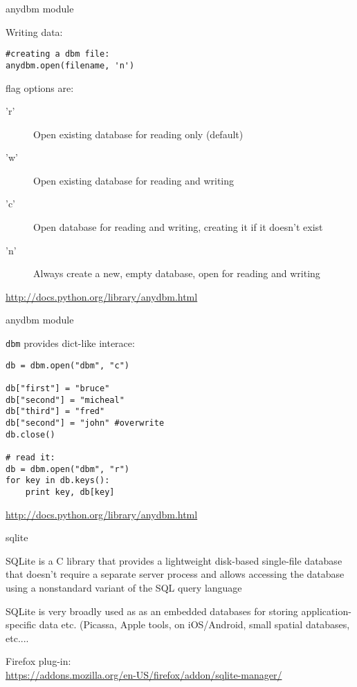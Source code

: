 \documentclass{beamer}
\begin{document}
\begin{frame}[fragile]{anydbm module}

{\Large Writing data:}

\begin{verbatim}
#creating a dbm file:
anydbm.open(filename, 'n') 
\end{verbatim}

{\large flag options are: }
\begin{description}
  \item['r'] 	Open existing database for reading only (default)
  \item['w'] 	Open existing database for reading and writing
  \item['c'] 	Open database for reading and writing, creating it if it doesn’t exist
  \item['n'] 	Always create a new, empty database, open for reading and writing
\end{description}
\vfill
\url{http://docs.python.org/library/anydbm.html}
\end{frame}

\begin{frame}[fragile]{anydbm module}

{\Large \verb|dbm| provides dict-like interace:}

\begin{verbatim}
db = dbm.open("dbm", "c")

db["first"] = "bruce"
db["second"] = "micheal"
db["third"] = "fred"
db["second"] = "john" #overwrite
db.close()

# read it:
db = dbm.open("dbm", "r")
for key in db.keys():
    print key, db[key]
\end{verbatim}

\vfill
\url{http://docs.python.org/library/anydbm.html}
\end{frame}



\begin{frame}[fragile]{sqlite}

\vfill
{\Large SQLite is a C library that provides a lightweight disk-based single-file database
        that doesn't require a separate server process and allows accessing the
        database using a nonstandard variant of the SQL query language}

\vfill
{\Large SQLite is very broadly used as as an embedded databases for storing
        application-specific data etc. (Picassa, Apple tools, on iOS/Android,
        small spatial databases, etc....}


\vfill
Firefox plug-in:\\
\url{https://addons.mozilla.org/en-US/firefox/addon/sqlite-manager/}
\end{frame} 
\end{document}
